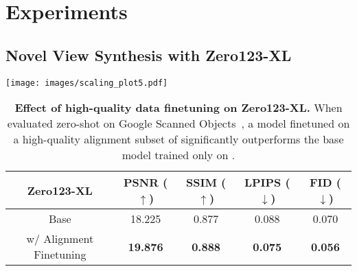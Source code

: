 \section{Experiments}
\label{sec:experiments}

\subsection{Novel View Synthesis with Zero123-XL}

\begin{figure*}
    \centering
    \texttt{[image: images/scaling\_plot5.pdf]}
    \label{fig:scale}
    \vspace*{-5mm}
\end{figure*}

\begin{table}[b!]
\centering
\vspace*{-4mm}
\begin{tabular}{@{}ccccc@{}}
\toprule
Zero123-XL                 & PSNR ($\uparrow$)    & SSIM ($\uparrow$) & LPIPS ($\downarrow$) & FID ($\downarrow$) \\ \midrule
{Base} & 18.225             & 0.877           & 0.088              & 0.070                        \\
{w/ Alignment Finetuning}               & \textbf{19.876}             & \textbf{0.888 }          & \textbf{0.075}              & \textbf{0.056}                        \\
 \bottomrule
\end{tabular}
\vspace{0.05in}
\caption{\textbf{Effect of high-quality data finetuning on Zero123-XL.} When evaluated zero-shot on Google Scanned Objects~\cite{downs2022google}, a model finetuned on a high-quality alignment subset of \dataset significantly outperforms the base model trained only on \dataset.
}

\label{tab:alignment}
\end{table}

